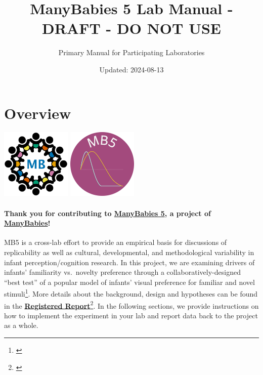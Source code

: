 \documentclass[
]{book}
\title{ManyBabies 5 Lab Manual - DRAFT - DO NOT USE}
\subtitle{Primary Manual for Participating Laboratories}
\author{}
\date{\vspace{-2.5em}Updated: 2024-08-13}
\begin{document}
\maketitle

{
\setcounter{tocdepth}{1}
\tableofcontents
}
\chapter*{Overview}\label{overview}

\includegraphics[width=0.25\textwidth,height=\textheight]{images/mb-logo.png} \includegraphics[width=0.25\textwidth,height=\textheight]{images/mb5-logo.png}

\subsubsection*{\texorpdfstring{Thank you for contributing to \href{https://manybabies.org/MB5/}{\textbf{ManyBabies 5}}, a project of \href{https://manybabies.org/}{\textbf{ManyBabies}}!}{Thank you for contributing to ManyBabies 5, a project of ManyBabies!}}\label{thank-you-for-contributing-to-manybabies-5-a-project-of-manybabies}

MB5 is a cross-lab effort to provide an empirical basis for discussions of replicability as well as cultural, developmental, and methodological variability in infant perception/cognition research. In this project, we are examining drivers of infants' familiarity vs.~novelty preference through a collaboratively-designed ``best test'' of a popular model of infants' visual preference for familiar and novel stimuli\footnote{\citet{hunterames}}. More details about the background, design and hypotheses can be found in the \href{https://osf.io/preprints/psyarxiv/ck3vd}{\textbf{Registered Report}}\footnote{\citet{kosiezettersten2024}}. In the following sections, we provide instructions on how to implement the experiment in your lab and report data back to the project as a whole.
\end{document}
